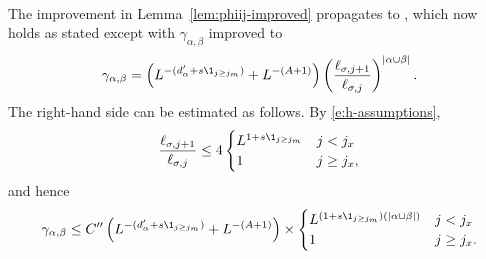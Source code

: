 \paragraph{\cite[Proposition~\ref{loc-prop:1-LTdefXY}]{BS-rg-loc}}
The improvement in Lemma~\ref{lem:phiij-improved} propagates to
\cite[Proposition~\ref{loc-prop:1-LTdefXY}]{BS-rg-loc}, which now holds
as stated except with
$\gamma_{\alpha,\beta}$
improved to
\begin{equation}
\label{e:cgamobs}
    \gamma_{\alpha,\beta}
        =
    \left(
    L^{-(d_\alpha' + s \1_{j \geq j_m})} +  L^{-(A+1)}
    \right)
    \left( \frac{\ell_{\sigma,j+1}}{\ell_{\sigma,j}} \right)^{|\alpha \cup \beta|}
    .
\end{equation}
The right-hand side can be estimated as follows.
By \eqref{e:h-assumptions},
\begin{equation}
\frac{\ell_{\sigma,j+1}}{\ell_{\sigma,j}} \leq
4
  \begin{cases}
  L^{1 + s \1_{{j \geq j_m}}} & j < j_x \\
  1 & j \geq j_x,
  \end{cases}
\end{equation}
and hence
\begin{equation}
\label{e:cgamobs-L}
    \gamma_{\alpha,\beta}
    \le C''
    \left(
    L^{-(d_\alpha' + s \1_{j \geq j_m})} +  L^{-(A+1)}
    \right)
    \times
    \begin{cases}
    L^{(1 + s \1_{{j \geq j_m}})(|\alpha \cup \beta|)} & j < j_x \\
    1 & j \geq j_x.
    \end{cases}
\end{equation}

